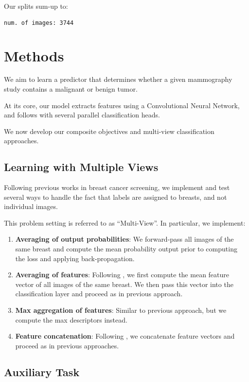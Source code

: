 \documentclass[11pt]{article}
\begin{document}
Our splits sum-up to:
\begin{verbatim}
num. of images: 3744
\end{verbatim}

\section{Methods}
\label{sec:org3a721d0}

We aim to learn a predictor that determines whether a given mammography study
contains a malignant or benign tumor.

At its core, our model extracts features using a Convolutional Neural Network,
and follows with several parallel classification heads.

We now develop our composite objectives and multi-view classification approaches.

\subsection{\label{multiview}Learning with Multiple Views}
\label{sec:org0cd89ff}

Following previous works in breast cancer screening,
we implement and test several ways to handle the fact that
labels are assigned to breasts, and not individual images.

This problem setting is referred to as ``Multi-View''.
In particular, we implement:

\begin{enumerate}
\item \textbf{Averaging of output probabilities}:  We forward-pass all images of the same breast
and compute the mean probability output prior to computing the loss and applying
back-propagation.
\item \textbf{Averaging of features}: Following \autocite{geras17} \autocite{seeland21}, we first compute the mean feature vector of all images of the same
breast. We then pass this vector into the classification layer and proceed as in
previous approach.
\item \textbf{Max aggregation of features}: Similar to previous approach, but we compute the max descriptors instead.
\item \textbf{Feature concatenation}: Following \autocite{wu19} \autocite{chen22}, we concatenate feature
vectors and proceed as in previous approaches.
\end{enumerate}

\subsection{Auxiliary Task}
\label{sec:orgedb9561}
\end{document}

